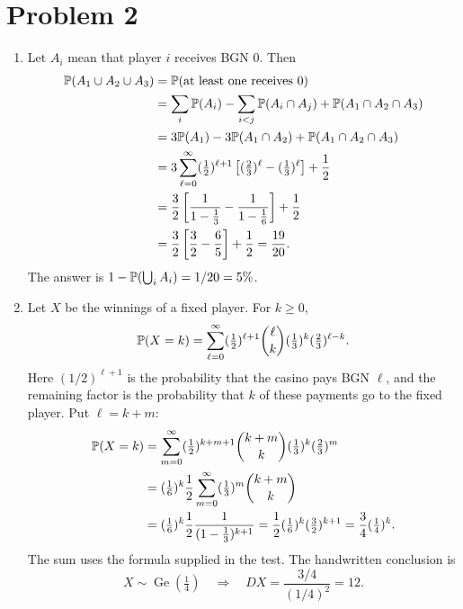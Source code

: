 \documentclass[a4paper]{article}
\begin{document}
\section*{Problem 2}
\begin{enumerate}
\item Let $A_i$ mean that player $i$ receives BGN 0. Then
\begin{align*}
\P(A_1\cup A_2\cup A_3)
&=\P(\text{at least one receives 0})\\
&=\sum_i\P(A_i)-\sum_{i<j}\P(A_i\cap A_j)+\P(A_1\cap A_2\cap A_3)\\
&=3\P(A_1)-3\P(A_1\cap A_2)+\P(A_1\cap A_2\cap A_3)\\
&=3\sum_{\ell=0}^\infty(\tfrac12)^{\ell+1}
\left[(\tfrac23)^\ell-(\tfrac13)^\ell\right]+\frac12\\
&=\frac32\left[\frac1{1-\frac13}-\frac1{1-\frac16}\right]+\frac12\\
&=\frac32\left[\frac32-\frac65\right]+\frac12=\frac{19}{20}.
\end{align*}
The answer is $1-\P(\bigcup_iA_i)=1/20=5\%$.
\item Let $X$ be the winnings of a fixed player. For $k\geq0$,
\[
\P(X=k)=\sum_{\ell=0}^\infty
(\tfrac12)^{\ell+1}\binom\ell k(\tfrac13)^k(\tfrac23)^{\ell-k}.
\]
Here $(1/2)^{\ell+1}$ is the probability that the casino pays BGN $\ell$, and the remaining factor is the probability that $k$ of these payments go to the fixed player.
Put $\ell=k+m$:
\begin{align*}
\P(X=k)&=\sum_{m=0}^\infty(\tfrac12)^{k+m+1}
\binom{k+m}{k}(\tfrac13)^k(\tfrac23)^m\\
&=(\tfrac16)^k\frac12\sum_{m=0}^\infty(\tfrac13)^m\binom{k+m}{k}\\
&=(\tfrac16)^k\frac12\frac1{(1-\frac13)^{k+1}}
=\frac12(\tfrac16)^k(\tfrac32)^{k+1}
=\frac34(\tfrac14)^k.
\end{align*}
The sum uses the formula supplied in the test. The handwritten conclusion is
\[
X\sim\operatorname{Ge}(\tfrac14)
\quad\Longrightarrow\quad
DX=\frac{3/4}{(1/4)^2}=12.
\]
\end{enumerate}
\end{document}
